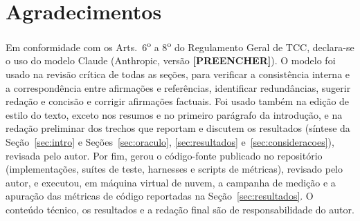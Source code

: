 \documentclass[12pt]{article}
\newcommand{\DeclaracaoExecucao}{ pelo autor, e executou, em máquina virtual de nuvem, a campanha de medição e a apuração das métricas de código reportadas na Seção~\ref{sec:resultados}}
\begin{document}
\section*{Agradecimentos}

Em conformidade com os Arts.~6\textsuperscript{o} a 8\textsuperscript{o} do
Regulamento Geral de TCC, declara-se o uso do modelo Claude (Anthropic, versão
\textbf{[PREENCHER]}). O modelo foi usado na revisão crítica de todas as seções, para verificar a
consistência interna e a correspondência entre afirmações e referências,
identificar redundâncias, sugerir redação e concisão e corrigir afirmações
factuais. Foi usado também na edição de estilo do texto, exceto nos resumos e no primeiro
parágrafo da introdução, e na redação preliminar dos trechos que reportam e discutem os
resultados (síntese da Seção~\ref{sec:intro} e
Seções~\ref{sec:oraculo}, \ref{sec:resultados} e~\ref{sec:consideracoes}),
revisada pelo autor. Por fim, gerou o código-fonte publicado no repositório
(implementações, suítes de teste, harnesses e scripts de métricas),
revisado\DeclaracaoExecucao. O conteúdo técnico, os resultados e
a redação final são de responsabilidade do autor.



\end{document}
